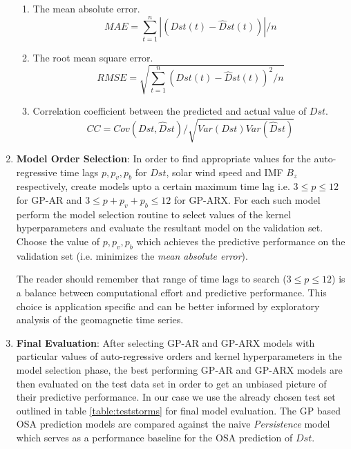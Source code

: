 \documentclass{article}
\begin{document}
\begin{enumerate}
  \begin{enumerate}
  \item The mean absolute error.
    \begin{equation}
      MAE = \sum_{t=1}^{n} \left |(Dst(t) - \hat{D}st(t)) \right | / n
    \end{equation}
  \item The root mean square error.
    \begin{equation}
      RMSE = \sqrt{\sum_{t=1}^{n} (Dst(t) - \hat{D}st(t))^2 / n}
    \end{equation}
  \item Correlation coefficient between the predicted and actual value of $Dst$.
    \begin{equation}
      CC = Cov(Dst, \hat{D}st)/\sqrt{Var(Dst) Var(\hat{D}st)}
    \end{equation}
  \end{enumerate}


\item \textbf{Model Order Selection}: In order to find appropriate
  values for the auto-regressive time lags $p, p_v, p_b$ for $Dst$,
  solar wind speed and IMF $B_z$ respectively, create models upto a
  certain maximum time lag i.e. $3 \leq p \leq 12$ for GP-AR and $3
  \leq p + p_v + p_b \leq 12$ for GP-ARX. For each such model perform
  the model selection routine to select values of the kernel
  hyperparameters and evaluate the resultant model on the validation
  set. Choose the value of $p, p_v, p_b$ which achieves the predictive
  performance on the validation set (i.e. minimizes the \emph{mean
    absolute error}).

  The reader should remember that range of time
  lags to search ($3 \leq p \leq 12$) is a balance between
  computational effort and predictive performance. This choice is
  application specific and can be better informed by exploratory
  analysis of the geomagnetic time series.

\item \textbf{Final Evaluation}: After selecting GP-AR and GP-ARX
  models with particular values of auto-regressive orders and kernel
  hyperparameters in the model selection phase, the best performing
  GP-AR and GP-ARX models are then evaluated on the test data set in
  order to get an unbiased picture of their predictive performance. In
  our case we use the already chosen test set outlined in table
  \ref{table:teststorms} for final model evaluation. The GP based OSA
  prediction models are compared against the naive \emph{Persistence}
  model which serves as a performance baseline for the OSA prediction
  of $Dst$.

\end{enumerate}
\end{document}
